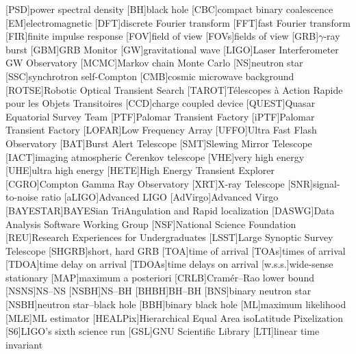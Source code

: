 \usepackage{acronym}

[PSD]{power spectral density}
[BH]{black hole}
[CBC]{compact binary coalescence}
[EM]{electromagnetic}
[DFT]{discrete Fourier transform}
[FFT]{fast Fourier transform}
[FIR]{finite impulse response}
[FOV]{field of view}
[FOVs]{fields of view}
[GRB]{$\gamma$\nobreakdashes-ray burst}
[GBM]{\acl{GRB} Monitor}
[GW]{gravitational wave}
[LIGO]{Laser Interferometer \acs{GW} Observatory}
[MCMC]{Markov chain Monte Carlo}
[NS]{neutron star}
[SSC]{synchrotron self\nobreakdashes-Compton}
[CMB]{cosmic microwave background}
[ROTSE]{Robotic Optical Transient Search}
[TAROT]{T\'{e}lescopes \`{a} Action Rapide pour les Objets Transitoires}
[CCD]{charge coupled device}
[QUEST]{Quasar Equatorial Survey Team}
[PTF]{Palomar Transient Factory}
[iPTF]{Palomar Transient Factory}
[LOFAR]{Low Frequency Array}
[UFFO]{Ultra Fast Flash Observatory}
[BAT]{Burst Alert Telescope}
[SMT]{Slewing Mirror Telescope}
[IACT]{imaging atmospheric \v{C}erenkov telescope}
[VHE]{very high energy}
[UHE]{ultra high energy}
[HETE]{High Energy Transient Explorer}
[CGRO]{Compton Gamma Ray Observatory}
[XRT]{X\nobreakdashes-ray Telescope}
[SNR]{signal\nobreakdashes-to\nobreakdashes-noise ratio}
[aLIGO]{Advanced \acs{LIGO}}
[AdVirgo]{Advanced Virgo}
[BAYESTAR]{BAYESian TriAngulation and Rapid localization}
[DASWG]{Data Analysis Software Working Group}
[NSF]{National Science Foundation}
[REU]{Research Experiences for Undergraduates}
[LSST]{Large Synoptic Survey Telescope}
[SHGRB]{short, hard \acl{GRB}}
[TOA]{time of arrival}
[TOAs]{times of arrival}
[TDOA]{time delay on arrival}
[TDOAs]{time delays on arrival}
[w.s.s.]{wide\nobreakdashes-sense stationary}
[MAP]{maximum a posteriori}
[CRLB]{Cram\'{e}r\nobreakdashes--Rao lower bound}
[NSNS]{\acl{NS}\nobreakdashes--\acl{NS}}
[NSBH]{\acl{NS}\nobreakdashes--\acl{BH}}
[BHBH]{\acl{BH}\nobreakdashes--\acl{BH}}
[BNS]{binary neutron star}
[NSBH]{neutron star\nobreakdashes--black hole}
[BBH]{binary black hole}
[ML]{maximum likelihood}
[MLE]{\ac{ML} estimator}
[HEALPix]{Hierarchical Equal Area isoLatitude Pixelization}
[S6]{\ac{LIGO}'s sixth science run}
[GSL]{GNU Scientific Library}
[LTI]{linear time invariant}
